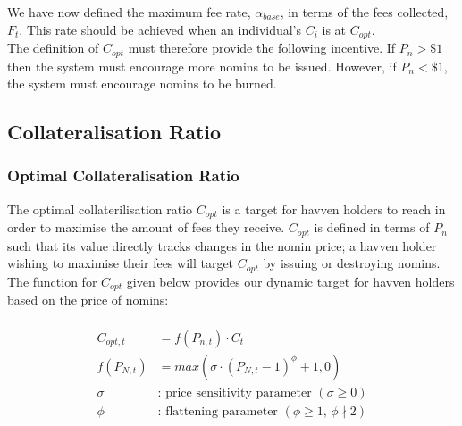 \noindent We have now defined the maximum fee rate, $\alpha_{base}$, in terms of the fees collected, $F_t$. This rate should be achieved when an individual's $C_i$ is at $C_{opt}$. \\

\noindent The definition of $C_{opt}$ must therefore provide the following incentive. If $P_n > \$1$ then the system must encourage more nomins to be issued. However, if $P_n < \$1$, the system must encourage nomins to be burned. 

\newpage

\subsection{Collateralisation Ratio}
\subsubsection{Optimal Collateralisation Ratio}

\noindent The optimal collaterilisation ratio $C_{opt}$ is a target for havven
holders to reach in order to maximise the amount of fees they receive.
$C_{opt}$ is defined in terms of $P_n$ such that its value directly tracks changes in the nomin price; a havven
holder wishing to maximise their fees will target $C_{opt}$ by issuing or destroying nomins. \\

\noindent The function for $C_{opt}$ given below provides our dynamic target
for havven holders based on the price of nomins:

\begin{gather} \label{eq:optcollateralisation}
\begin{align}
\begin{split}
C_{opt,t} &= f(P_{n,t}) \cdot C_t  \\ 
f(P_{N,t}) &= max(\sigma \cdot (P_{N,t} - 1)^{\phi} + 1, 0) \\
\sigma & \text{: price sensitivity parameter } (\sigma \geq 0)\\
\phi   & \text{: flattening parameter } (\phi \geq 1 \text{, } \phi \nmid 2) \\
\end{split}
\end{align}
\end{gather}


\begin{center}
\end{center}

